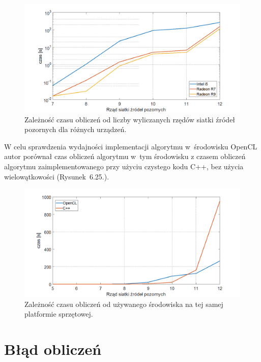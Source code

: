 \begin{figure}[H]
        \centering
                \centering
                \includegraphics[width=16cm]{wykres}
	\caption{Zależność czasu obliczeń od liczby wyliczanych rzędów siatki źródeł pozornych dla różnych urządzeń.}
\end{figure}

W celu sprawdzenia wydajności implementacji algorytmu w~środowisku OpenCL autor porównał czas obliczeń algorytmu w~tym środowisku z czasem obliczeń algorytmu zaimplementowanego przy użyciu czystego kodu C++, bez użycia wielowątkowości (Rysunek~6.25.).

\begin{figure}[H]
        \centering
                \centering
                \includegraphics[width=16cm]{wykres2}
	\caption{Zależność czasu obliczeń od używanego środowiska na tej samej platformie sprzętowej.}
\end{figure}



\section{Błąd obliczeń}\label{sec:asdas2sd}

